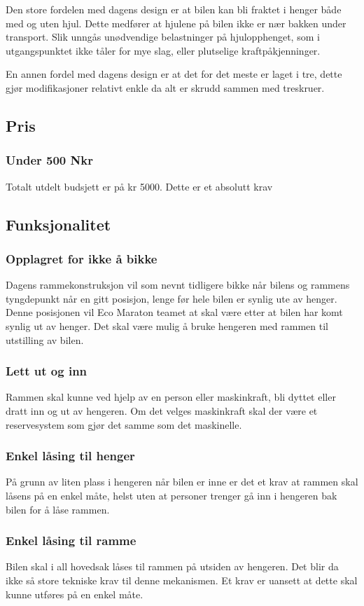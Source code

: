 Den store fordelen med dagens design er at bilen kan bli fraktet i henger både med og uten hjul. Dette medfører at hjulene på bilen ikke er nær bakken under transport. Slik unngås unødvendige belastninger på hjulopphenget, som i utgangspunktet ikke tåler for mye slag, eller plutselige kraftpåkjenninger. 

En annen fordel med dagens design er at det for det meste er laget i tre, dette gjør modifikasjoner relativt enkle da alt er skrudd sammen med treskruer.

\subsection{Pris}
\subsubsection{Under 500 Nkr}
Totalt utdelt budsjett er på kr 5000. Dette er et absolutt krav
\subsection{Funksjonalitet}
\subsubsection{Opplagret for ikke å bikke}
Dagens rammekonstruksjon vil som nevnt tidligere bikke når bilens og rammens tyngdepunkt når en gitt posisjon, lenge før hele bilen er synlig ute av henger. Denne posisjonen vil Eco Maraton teamet at skal være etter at bilen har komt synlig ut av henger. Det skal være mulig å bruke hengeren med rammen til utstilling av bilen. 
\subsubsection{Lett ut og inn}
Rammen skal kunne ved hjelp av en person eller maskinkraft, bli dyttet eller dratt inn og ut av hengeren. Om det velges maskinkraft skal der være et reservesystem som gjør det samme som det maskinelle. 
\subsubsection{Enkel låsing til henger}
På grunn av liten plass i hengeren når bilen er inne er det et krav at rammen skal låsens på en enkel måte, helst uten at personer trenger gå inn i hengeren bak bilen for å låse rammen. 
\subsubsection{Enkel låsing til ramme}
Bilen skal i all hovedsak låses til rammen på utsiden av hengeren. Det blir da ikke så store tekniske krav til denne mekanismen. Et krav er uansett at dette skal kunne utføres på en enkel måte.
